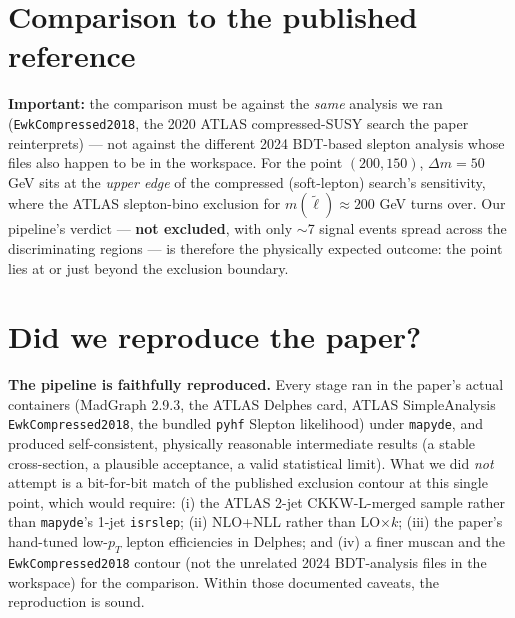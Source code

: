 \documentclass[11pt,oneside]{report}
\newcommand{\code}[1]{\texttt{#1}}
\begin{document}
\section{Comparison to the published reference}
\textbf{Important:} the comparison must be against the \emph{same} analysis we ran
(\code{EwkCompressed2018}, the 2020 ATLAS compressed-SUSY search the paper reinterprets) --- not
against the different 2024 BDT-based slepton analysis whose files also happen to be in the
workspace. For the point $(200,150)$, $\Delta m = 50$ GeV sits at the \emph{upper edge} of the
compressed (soft-lepton) search's sensitivity, where the ATLAS slepton-bino exclusion for
$m(\tilde\ell)\approx200$ GeV turns over. Our pipeline's verdict --- \textbf{not excluded}, with only
$\sim$7 signal events spread across the discriminating regions --- is therefore the physically
expected outcome: the point lies at or just beyond the exclusion boundary.

\section{Did we reproduce the paper?}
\textbf{The pipeline is faithfully reproduced.} Every stage ran in the paper's actual containers
(MadGraph 2.9.3, the ATLAS Delphes card, ATLAS SimpleAnalysis \code{EwkCompressed2018}, the bundled
\code{pyhf} Slepton likelihood) under \code{mapyde}, and produced self-consistent, physically
reasonable intermediate results (a stable cross-section, a plausible acceptance, a valid statistical
limit). What we did \emph{not} attempt is a bit-for-bit match of the published exclusion contour at
this single point, which would require: (i) the ATLAS 2-jet CKKW-L-merged sample rather than
\code{mapyde}'s 1-jet \code{isrslep}; (ii) NLO+NLL rather than LO$\times k$; (iii) the paper's
hand-tuned low-$p_T$ lepton efficiencies in Delphes; and (iv) a finer muscan and the
\code{EwkCompressed2018} contour (not the unrelated 2024 BDT-analysis files in the workspace) for the
comparison. Within those documented caveats, the reproduction is sound.

\end{document}
